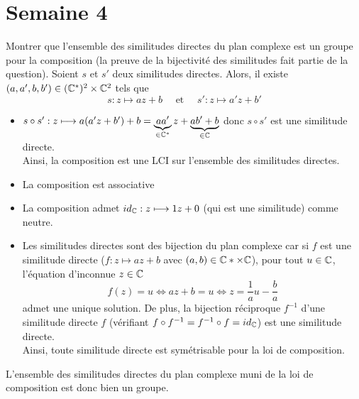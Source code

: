 \documentclass{article}
\renewenvironment{question_kholle}[2][ ]
{
	\subsection{\texorpdfstring{#2}{}}
	\notblank{#1}
	{
		\noindent #1
		\bigbreak
	}
	{}
	\begin{proof}
}
{
	\end{proof}
}
\begin{document}
\pagebreak\section{Semaine 4}
\begin{question_kholle}{Montrer que l'ensemble des similitudes directes du plan complexe est un groupe pour la composition (la preuve de la bijectivité des similitudes fait partie de la question).}
	Soient $s$ et $s'$ deux similitudes directes. Alors, il existe $(a,a',b,b')\in(\mathbb C^*)^2\times \mathbb C^2$ tels que
	\[
		s:z\longmapsto az+b \quad\text{ et }\quad s':z\longmapsto a'z+b'
	\]
	\begin{itemize}[label=$\star$]
		\item $s\circ s': z\longmapsto a(a'z+b')+b = \underbrace{aa'}_{\in\mathbb C^*}z+\underbrace{ab'+b}_{\in\mathbb C}$ donc $s\circ s'$ est une similitude directe.\\
		      Ainsi, la composition est une LCI sur l'ensemble des similitudes directes.
		\item La composition est associative
		\item La composition admet $id_{\mathbb C}:z\longmapsto 1z+0$ (qui est une similitude) comme neutre.
		\item Les similitudes directes sont des bijection du plan complexe car si $f$ est une similitude directe ($f:z\longmapsto az+b$ avec $(a,b)\in\mathbb C*\times\mathbb C$), pour tout $u\in\mathbb C$, l'équation d'inconnue $z\in\mathbb C$
		      \[
			      f(z)=u \iff az+b=u \iff z=\frac{1}{a}u-\frac{b}{a}
		      \]
		      admet une unique solution. De plus, la bijection réciproque $f^{-1}$ d'une similitude directe $f$ (vérifiant $f\circ f^{-1} = f^{-1}\circ f = id_{\mathbb C}$) est une similitude directe.\\
		      Ainsi, toute similitude directe est symétrisable pour la loi de composition.
	\end{itemize}
	L'ensemble des similitudes directes du plan complexe muni de la loi de composition est donc bien un groupe.
\end{question_kholle}
\end{document}
